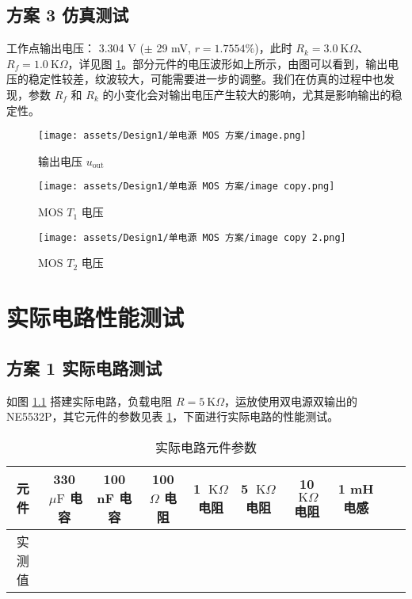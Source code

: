 \documentclass[UTF8]{article}
\def\kO{\ \mathrm{K}\Omega}
\def\uF{\ \mu\mathrm{F}}
\def\kO{\ \mathrm{K}\Omega}
\def\uF{\ \mu\mathrm{F}}
\theoremstyle{MyLineTheoremStyle} %
\theoremstyle{MyBlockTheoremStyle} %
\theoremstyle{MySubsubsectionStyle} %
\begin{document}
\subsection{方案 3 仿真测试}

工作点输出电压： 3.304 V ($\pm$ 29 mV, $r = 1.7554 \%$)，此时 $R_k = 3.0 \kO$、$R_f = 1.0 \kO$，详见图 \ref{输出电压 3}。部分元件的电压波形如上所示，由图可以看到，输出电压的稳定性较差，纹波较大，可能需要进一步的调整。我们在仿真的过程中也发现，参数 $R_f$ 和 $R_k$ 的小变化会对输出电压产生较大的影响，尤其是影响输出的稳定性。

\begin{figure}[H]\centering
    \texttt{[image: assets/Design1/单电源 MOS 方案/image.png]}
    \caption{输出电压 $u_\text{out}$}
    \label{输出电压 3}
\end{figure}
\begin{figure}[H]\centering
    \texttt{[image: assets/Design1/单电源 MOS 方案/image copy.png]}
    \caption{MOS $T_1$ 电压}
\end{figure}
\begin{figure}[H]\centering
    \texttt{[image: assets/Design1/单电源 MOS 方案/image copy 2.png]}
    \caption{MOS $T_2$ 电压}
\end{figure}



\section{实际电路性能测试}

\subsection{方案 1 实际电路测试}

如图 \ref{} 搭建实际电路，负载电阻 $R = 5 \kO$，运放使用双电源双输出的 NE5532P，其它元件的参数见表 \ref{实际电路元件参数}，下面进行实际电路的性能测试。

\begin{table}[H]\centering
    \caption{实际电路元件参数}
    \label{实际电路元件参数}
    \begin{tabular}{cccccccccc}\toprule
        元件 & 330 $\uF$ 电容 & 100 nF 电容 & 100 $\Omega$ 电阻 & 1 $\kO$ 电阻 & 5 $\kO$ 电阻 & 10 $\kO$ 电阻 & 1 mH 电感\\
        \midrule
        实测值 &  &   \\
        \bottomrule
    \end{tabular}
\end{table}
\end{document}
